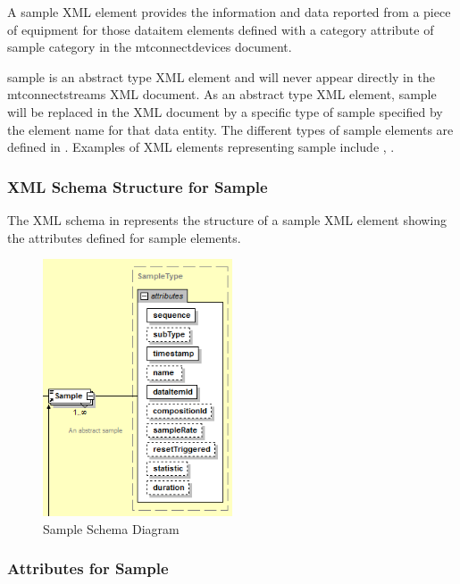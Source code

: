 A \gls{sample} XML element provides the information and data reported from a piece of equipment for those \gls{dataitem} elements defined with a \gls{category} attribute of \gls{sample category} in the \gls{mtconnectdevices} document.

\gls{sample} is an abstract type XML element and will never appear directly in the \gls{mtconnectstreams} XML document.  As an abstract \gls{type} XML element, \gls{sample} will be replaced in the XML document by a specific \gls{type} of \gls{sample} specified by the \gls{element name} for that \gls{data entity}.  The different \glspl{type} of \gls{sample} elements are defined in .  Examples of XML elements representing \gls{sample} include , . 



\subsubsection{XML Schema Structure for Sample}

The XML schema in  represents the structure of a \gls{sample} XML element showing the attributes defined for \gls{sample} elements.

\begin{figure}[ht]
  \centering
  \includegraphics[width=0.5\textwidth]{figures/sample-schema-diagram.png}
  \caption{Sample Schema Diagram}
  \label{fig:sample-schema-diagram}
\end{figure}
\FloatBarrier

\subsubsection{Attributes for Sample}

